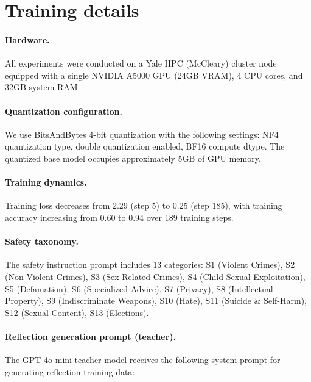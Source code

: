 \documentclass[11pt]{article}
\begin{document}
\newpage
\appendix
\section{Training details}
\label{app:training}

\paragraph{Hardware.} All experiments were conducted on a Yale HPC (McCleary) cluster node equipped with a single NVIDIA A5000 GPU (24GB VRAM), 4 CPU cores, and 32GB system RAM.

\paragraph{Quantization configuration.} We use BitsAndBytes 4-bit quantization with the following settings: NF4 quantization type, double quantization enabled, BF16 compute dtype. The quantized base model occupies approximately 5GB of GPU memory.

\paragraph{Training dynamics.} Training loss decreases from 2.29 (step 5) to 0.25 (step 185), with training accuracy increasing from 0.60 to 0.94 over 189 training steps.

\paragraph{Safety taxonomy.} The safety instruction prompt includes 13 categories: S1 (Violent Crimes), S2 (Non-Violent Crimes), S3 (Sex-Related Crimes), S4 (Child Sexual Exploitation), S5 (Defamation), S6 (Specialized Advice), S7 (Privacy), S8 (Intellectual Property), S9 (Indiscriminate Weapons), S10 (Hate), S11 (Suicide \& Self-Harm), S12 (Sexual Content), S13 (Elections).

\paragraph{Reflection generation prompt (teacher).} The GPT-4o-mini teacher model receives the following system prompt for generating reflection training data:
\end{document}
